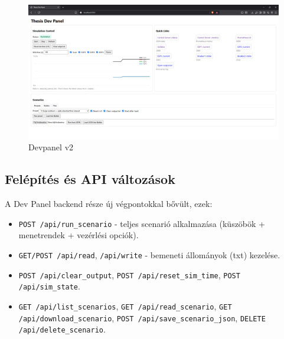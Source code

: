 \begin{figure}[H]
    \centering
    \includegraphics[width=1\textwidth]{figures/devpanel_v2.png}
    \caption{Devpanel v2}
    \label{fig:devpanel}
\end{figure}

\subsection{Felépítés és API változások}
A Dev Panel backend része új végpontokkal bővült, ezek:
\begin{itemize}
  \item \verb|POST /api/run_scenario| \;-\; teljes scenarió alkalmazása 
  (küszöbök + menetrendek + vezérlési opciók).
  \item \verb|GET/POST /api/read|, \verb|/api/write| \;-\; bemeneti állományok (txt) kezelése.
  \item \verb|POST /api/clear_output|, \verb|POST /api/reset_sim_time|, 
  \verb|POST /api/sim_state|.
  \item \verb|GET /api/list_scenarios|, \verb|GET /api/read_scenario|, 
  \verb|GET /api/download_scenario|, \verb|POST /api/save_scenario_json|, 
  \verb|DELETE /api/delete_scenario|.
\end{itemize}


